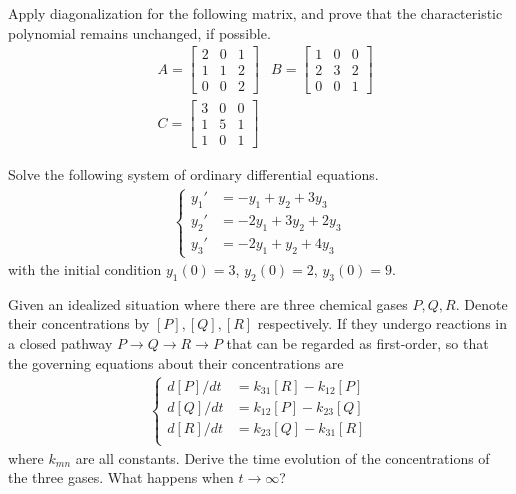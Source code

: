 \begin{Exercise}
Apply diagonalization for the following matrix, and prove that the characteristic polynomial remains unchanged, if possible.
\begin{align*}
&A =
\begin{bmatrix}
2 & 0 & 1\\
1 & 1 & 2\\
0 & 0 & 2
\end{bmatrix} 
&B =
\begin{bmatrix}
1 & 0 & 0\\
2 & 3 & 2\\
0 & 0 & 1
\end{bmatrix} \\
&C = 
\begin{bmatrix}
3 & 0 & 0\\
1 & 5 & 1\\
1 & 0 & 1
\end{bmatrix} 
\end{align*}
\end{Exercise}

\begin{Exercise}
Solve the following system of ordinary differential equations.
\begin{align*}
\begin{cases}
y_1' &= -y_1 + y_2 + 3y_3\\
y_2' &= -2y_1 + 3y_2 + 2y_3\\
y_3' &= -2y_1 + y_2 + 4y_3
\end{cases}
\end{align*}
with the initial condition $y_1(0) = 3$, $y_2(0) = 2$, $y_3(0) = 9$.
\end{Exercise}

\begin{Exercise}
Given an idealized situation where there are three chemical gases $P, Q, R$. Denote their concentrations by $[P], [Q], [R]$ respectively. If they undergo reactions in a closed pathway $P \to Q \to R \to P$ that can be regarded as first-order, so that the governing equations about their concentrations are
\begin{align*}
\begin{cases}
d[P]/dt &= k_{31}[R] - k_{12}[P] \\
d[Q]/dt &= k_{12}[P] - k_{23}[Q] \\
d[R]/dt &= k_{23}[Q] - k_{31}[R] \\
\end{cases}
\end{align*}
where $k_{mn}$ are all constants. Derive the time evolution of the concentrations of the three gases. What happens when $t \to \infty$?
\end{Exercise}